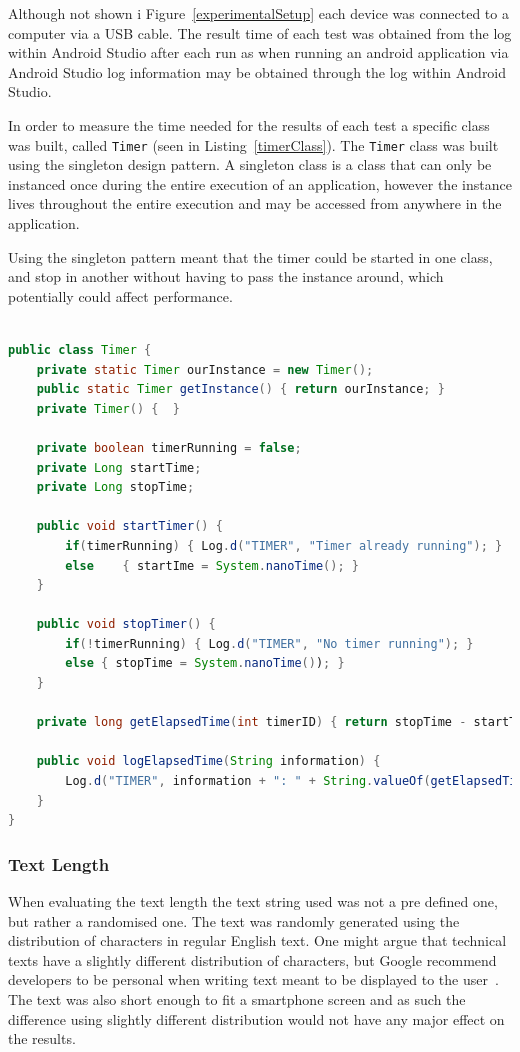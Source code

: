 Although not shown i Figure~\ref{experimentalSetup} each device was connected to a computer via a USB cable. The  result time of each test was obtained from the log within Android Studio after each run as when running an android application via Android Studio log information may be obtained through the log within Android Studio.

In order to measure the time needed for the results of each test a specific class was built, called \texttt{Timer} (seen in Listing~\ref{timerClass}). The \texttt{Timer} class was built using the singleton design pattern. A singleton class is a class that can only be instanced once during the entire execution of an application, however the instance lives throughout the entire execution and may be accessed from anywhere in the application.

Using the singleton pattern meant that the timer could be started in one class, and stop in another without having to pass the instance around, which potentially could affect performance.

\begin{lstlisting}[language=Java, caption={The Timer class}, label=timerClass]

public class Timer {
	private static Timer ourInstance = new Timer();
	public static Timer getInstance() { return ourInstance; }
	private Timer() {  }
	
	private boolean timerRunning = false;
	private Long startTime;
	private Long stopTime;
	
	public void startTimer() { 
		if(timerRunning) { Log.d("TIMER", "Timer already running"); }
		else 	{ startIme = System.nanoTime(); }
	}
	
	public void stopTimer() {
		if(!timerRunning) { Log.d("TIMER", "No timer running"); }
		else { stopTime = System.nanoTime()); }
	}
	
	private long getElapsedTime(int timerID) { return stopTime - startTime; }
	
	public void logElapsedTime(String information) {
		Log.d("TIMER", information + ": " + String.valueOf(getElapsedTime() + " nano seconds");
	}
}
\end{lstlisting}

\subsubsection{Text Length}
When evaluating the text length the text string used was not a pre defined one, but rather a randomised one. The text was randomly generated using the distribution of characters in regular English text. One might argue that technical texts have a slightly different distribution of characters, but Google recommend developers to be personal when writing text meant to be displayed to the user~\cite{glassDesignStyle}. The text was also short enough to fit a smartphone screen and as such the difference using slightly different distribution would not have any major effect on the results.

